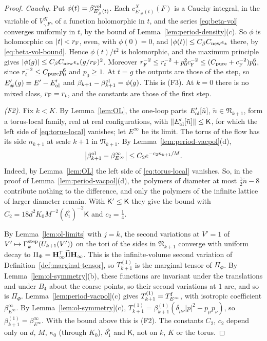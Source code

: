 \begin{proof}
\emph{Cauchy.} Put $\phi(t)=\beta^{\rm vol}_{E'_\#(t)}$. Each $c^X_{E'_\#(t)}(F)$ is a Cauchy integral, in the variable of $V^X_{\cdot,F}$, of a function holomorphic in $t$, and the series \eqref{eq:beta-vol} converges uniformly in $t$, by the bound of Lemma~\ref{lem:period-density}(c). So $\phi$ is holomorphic on $|t|<r_{\rm F}$, even, with $\phi(0)=0$, and $|\phi(t)|\le C_\beta C_{\rm new}\epsilon_*$ there, by \eqref{eq:beta-vol-bound}. Hence $\phi(t)/t^2$ is holomorphic, and the maximum principle gives $|\phi(g)|\le C_\beta C_{\rm new}\epsilon_*(g/r_{\rm F})^2$. Moreover $r_{\rm F}^{-2}\le r_t^{-2}+p_0^2c_{\rm F}^{-2}\le(C_{\rm pure}+c_{\rm F}^{-2})p_0^6$, since $r_t^{-2}\le C_{\rm pure}p_0^6$ and $p_0\ge1$. At $t=g$ the outputs are those of the step, so $E'_\#(g)=E'-E'_{\rm ol}$ and $\beta_{k+1}-\beta^{\rm ol}_{k+1}=\phi(g)$. This is (F3). At $k=0$ there is no mixed class, $r_{\rm F}=r_t$, and the constants are those of the first step.

\emph{(F2).} Fix $k<K$. By Lemma~\ref{lem:OL}, the one-loop parts $E'_{\rm ol}[\tilde n]$, $\tilde n\in\mathfrak N_{k+1}$, form a torus-local family, real at real configurations, with $\|E'_{\rm ol}[\tilde n]\|\le\mathsf K$, for which the left side of \eqref{eq:torus-local} vanishes; let $E^\infty$ be its limit. The torus of the flow has its side $n_{k+1}$ at scale $k+1$ in $\mathfrak N_{k+1}$. By Lemma~\ref{lem:period-vacpol}(d),
\[
\big|\beta^{\rm ol}_{k+1}-\beta^\infty_{E^\infty}\big|\le C_2e^{-c_2n_{k+1}/M}.
\]
Indeed, by Lemma~\ref{lem:OL} the left side of \eqref{eq:torus-local} vanishes. So, in the proof of Lemma~\ref{lem:period-vacpol}(d), the polymers of diameter at most $\frac12\tilde n-8$ contribute nothing to the difference, and only the polymers of the infinite lattice of larger diameter remain. With $\mathsf K'\le\mathsf K$ they give the bound with $C_2=18d^2K_0M^{-2}(\delta_1^\flat)^{-2}\mathsf K$ and $c_2=\frac14$.

By Lemma~\ref{lem:ol-limits} with $j=k$, the second variations at $V'=1$ of $V'\mapsto\Gamma^{\rm step}_k(U_{k+1}(V'))$ on the tori of the sides in $\mathfrak N_{k+1}$ converge with uniform decay to $\Pi_\Phi=\mathbf H_\infty^{\sf T}\widetilde\Pi\mathbf H_\infty$. This is the infinite-volume second variation of Definition~\ref{def:marginal-tensor}, so $T^{(1)}_{k+1}$ is the marginal tensor of $\Pi_\Phi$. By Lemma~\ref{lem:ol-symmetry}(b), these functions are invariant under the translations and under $B_4$ about the coarse points, so their second variations at $1$ are, and so is $\Pi_\Phi$. Lemma~\ref{lem:period-vacpol}(c) gives $T^{(1)}_{k+1}=T^{\rm f}_{E^\infty}$, with isotropic coefficient $\beta^\infty_{E^\infty}$. By Lemma~\ref{lem:ol-symmetry}(c), $T^{(1)}_{k+1}=\beta^{(1)}_{k+1}(\delta_{\mu\nu}|p|^2-p_\mu p_\nu)$, so $\beta^{(1)}_{k+1}=\beta^\infty_{E^\infty}$. With the bound above this is (F2). The constants $C_2$, $c_2$ depend only on $d$, $M$, $\kappa_0$ (through $K_0$), $\delta_1^\flat$ and $\mathsf K$, not on $k$, $K$ or the torus.
\end{proof}

